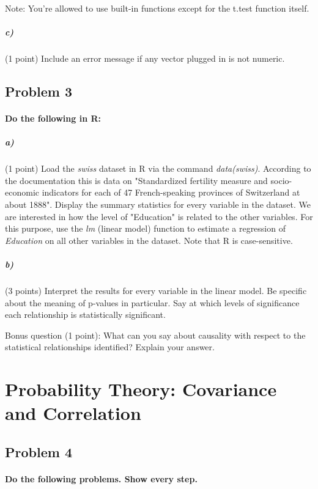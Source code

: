 \documentclass[12pt,letter]{article}
\begin{document}
Note: You're allowed to use built-in functions except for the t.test function itself.

\subparagraph{c)} (1 point) Include an error message if any vector plugged in is not numeric.



\pagebreak

\subsection*{Problem 3}

\paragraph{Do the following in R:}

\subparagraph{a)} (1 point) Load the \textit{swiss} dataset in R via the command \textit{data(swiss)}. According to the documentation this is data on "Standardized fertility measure and socio-economic indicators for each of 47 French-speaking provinces of Switzerland at about 1888". Display the summary statistics for every variable in the dataset. We are interested in how the level of "Education" is related to the other variables. For this purpose, use the \textit{lm} (linear model) function to estimate a regression of \textit{Education} on all other variables in the dataset. Note that R is case-sensitive.

\subparagraph{b)} (3 points) Interpret the results for every variable in the linear model. Be specific about the meaning of p-values in particular. Say at which levels of significance each relationship is statistically significant.

Bonus question (1 point): What can you say about causality with respect to the statistical relationships identified? Explain your answer.



\section*{Probability Theory: Covariance and Correlation}

\subsection*{Problem 4}

\paragraph{Do the following problems. Show every step.}
\end{document}
